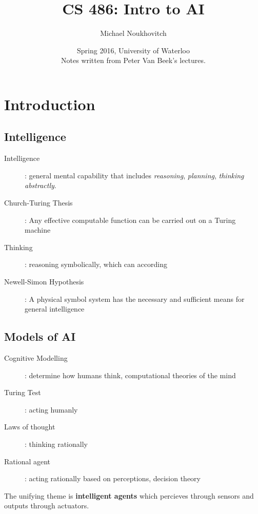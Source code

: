 \documentclass[]{article}
\theoremstyle{definition}
\begin{document}
	\let\ref\Cref

	\title{\bf{CS 486: Intro to AI}}
	\date{Spring 2016, University of Waterloo \\ \center Notes written from Peter Van Beek's lectures.}
	\author{Michael Noukhovitch}

	\maketitle
	\newpage
	\tableofcontents
	\newpage

	\section{Introduction}
	
	\subsection{Intelligence}
	\begin{description}
		\item[Intelligence]: general mental capability that includes \textit{reasoning}, \textit{planning}, \textit{thinking abstractly}.
		\item[Church-Turing Thesis]: Any effective computable function can be carried out on a Turing machine
		\item[Thinking]: reasoning symbolically, which can according
		\item[Newell-Simon Hypothesis]: A physical symbol system has the necessary and sufficient means for general intelligence
	\end{description}

	\subsection{Models of AI}
	\begin{description}
		\item[Cognitive Modelling]: determine how humans think, computational theories of the mind
		\item[Turing Test]: acting humanly
		\item[Laws of thought]: thinking rationally
		\item[Rational agent]: acting rationally based on perceptions, decision theory
	\end{description}
	The unifying theme is \textbf{intelligent agents} which percieves through sensors and outputs through actuators.
\end{document}
